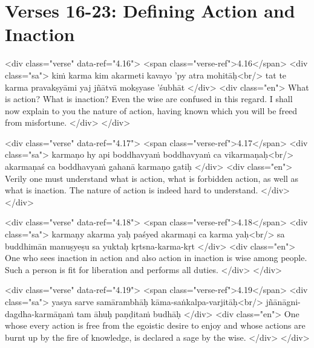 \section{Verses 16-23: Defining Action and Inaction}\label{sec-verses-16-23-defining-action-and-inaction}

\begin{html}
<div class="verse" data-ref="4.16">
  <span class="verse-ref">4.16</span>
  <div class="sa">
    kiṁ karma kim akarmeti kavayo ’py atra mohitāḥ<br/>
    tat te karma pravakṣyāmi yaj jñātvā mokṣyase ’śubhāt
  </div>
  <div class="en">
    What is action? What is inaction? Even the wise are confused in this regard. I shall now explain to you the nature of action, having known which you will be freed from misfortune.
  </div>
</div>
\end{html}



\begin{html}
<div class="verse" data-ref="4.17">
  <span class="verse-ref">4.17</span>
  <div class="sa">
    karmaṇo hy api boddhavyaṁ boddhavyaṁ ca vikarmaṇaḥ<br/>
    akarmaṇaś ca boddhavyaṁ gahanā karmaṇo gatiḥ
  </div>
  <div class="en">
    Verily one must understand what is action, what is forbidden action, as well as what is inaction. The nature of action is indeed hard to understand.
  </div>
</div>
\end{html}



\begin{html}
<div class="verse" data-ref="4.18">
  <span class="verse-ref">4.18</span>
  <div class="sa">
    karmaṇy akarma yaḥ paśyed akarmaṇi ca karma yaḥ<br/>
    sa buddhimān manuṣyeṣu sa yuktaḥ kṛtsna-karma-kṛt
  </div>
  <div class="en">
    One who sees inaction in action and also action in inaction is wise among people. Such a person is fit for liberation and performs all duties.
  </div>
</div>
\end{html}



\begin{html}
<div class="verse" data-ref="4.19">
  <span class="verse-ref">4.19</span>
  <div class="sa">
    yasya sarve samārambhāḥ kāma-saṅkalpa-varjitāḥ<br/>
    jñānāgni-dagdha-karmāṇaṁ tam āhuḥ paṇḍitaṁ budhāḥ
  </div>
  <div class="en">
    One whose every action is free from the egoistic desire to enjoy and whose actions are burnt up by the fire of knowledge, is declared a sage by the wise.
  </div>
</div>
\end{html}




